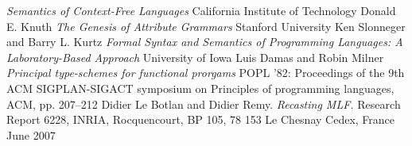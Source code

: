 \documentclass[twoside, titlepage, openright, a4paper]{book}
\begin{document}
\begin{thebibliography}{9}
  \emph{Semantics of Context-Free Languages}
  California Institute of Technology
  Donald E. Knuth
  \emph{The Genesis of Attribute Grammars}
  Stanford University
  Ken Slonneger and Barry L. Kurtz
  \emph{Formal Syntax and Semantics of Programming Languages: A Laboratory-Based Approach}
  University of Iowa
  Luis Damas and Robin Milner
  \emph{Principal type-schemes for functional prorgams}
  POPL '82: Proceedings of the 9th ACM SIGPLAN-SIGACT symposium on Principles of programming languages, ACM, pp. 207–212
  Didier Le Botlan and Didier Remy.
  \emph{Recasting MLF.}
  Research Report 6228, INRIA, Rocquencourt, BP 105, 78 153 Le Chesnay Cedex, France June 2007
\end{thebibliography}
\end{document}
